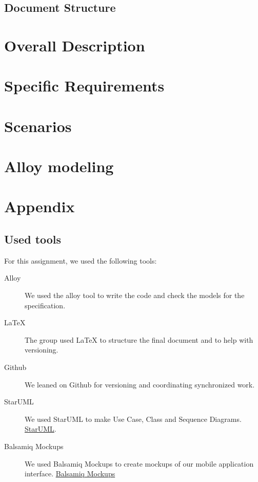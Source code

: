\documentclass[12pt, a4paper]{article}
\begin{document}
		\subsection{Document Structure}	
			
		


	\newpage
	\section{Overall Description}
		


	\newpage
	\section{Specific Requirements}
		

	\newpage
	\section{Scenarios}
		


	\newpage
	\section{Alloy modeling}
		


	\newpage	
	\section{Appendix}
		\listoffigures
		\listoftables
		
		\subsection{Used tools}
		For this assignment, we used the following tools:
		
		\begin{description}
			\item [Alloy] We used the alloy tool to write the code and check the models for the specification.
			\item [LaTeX] The group used LaTeX to structure the final document and to help with versioning.
			\item [Github] We leaned on Github for versioning and coordinating synchronized work.
			\item[StarUML] We used StarUML  to make Use Case, Class and Sequence Diagrams. \href{http://staruml.io/}{StarUML}.
			\item[Balsamiq Mockups] We used Balsamiq Mockups to create mockups of our mobile application interface. \href{https://balsamiq.com/products/mockups/}{Balsamiq Mockups}
			
		\end{description}
		
\end{document}
